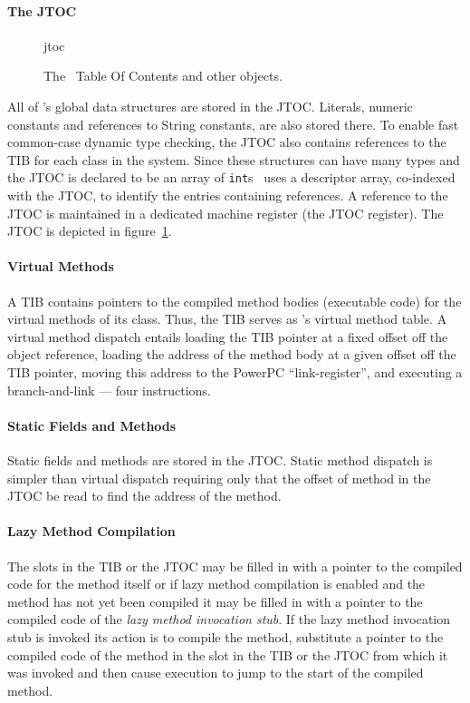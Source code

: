\paragraph{The JTOC}
\begin{figure}[htb]
\begin{gif}{jtoc}
\vbox{
\hbox{}
}\hfil
\end{gif}
\caption{The \jp\ Table Of Contents and other objects.}
\label{fig:jtoc}
\end{figure}
All of \jp's global data structures are stored in the JTOC. 
Literals, numeric
constants and references to String constants, are also stored there.
To enable fast common-case dynamic type checking, the JTOC also
contains references to the TIB for each class in the system.  
Since these 
structures can have many types and the JTOC is declared to be an array of 
{\tt int}s  
\jp\ uses a descriptor array, co-indexed with the JTOC, 
to identify the entries containing references.
A reference to the JTOC is maintained in a dedicated machine register 
(the JTOC register).
The JTOC
is depicted in figure~\ref{fig:jtoc}.  

\paragraph{Virtual Methods}
A TIB contains pointers to the compiled method 
bodies (executable code) for the virtual methods of its class. 
Thus, the TIB serves as \jp's virtual method table.
A
virtual method dispatch entails loading the TIB pointer at a fixed
offset off the object reference, loading the address of the method
body at a given offset off the TIB pointer, moving this address to the
PowerPC ``link-register'', and executing a branch-and-link --- four
instructions.

\paragraph{Static Fields and Methods} 
Static fields and methods are stored in the JTOC. Static method dispatch is 
simpler than virtual dispatch requiring only that the offset of method in the 
JTOC be read to find the address of the method. 

\paragraph{Lazy Method Compilation}
The slots in the TIB or the JTOC may be filled in with 
a pointer to the compiled code for the method itself or if lazy method 
compilation is enabled and the method has not yet been compiled 
it may be filled in with
a pointer to the compiled code of the {\em lazy method invocation stub}.
If the lazy method invocation stub is invoked its action is to compile the 
method, substitute a pointer to the compiled code of the method in the slot in
the TIB or the JTOC from which it was invoked and then 
cause execution to jump to the start of the compiled method. 

